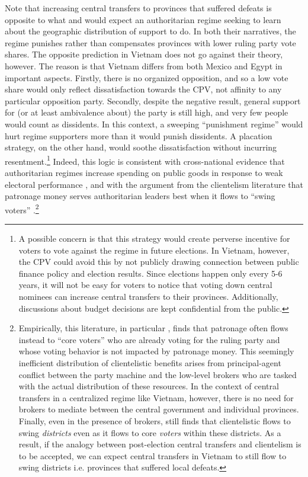 \documentclass[12pt]{article}\usepackage[]{graphicx}\usepackage[]{color}
\newcommand{\1}{\mathbbm{1}}
\begin{document}
Note that increasing central transfers to provinces that suffered defeats is opposite to what \cite{Magaloni2006} and \cite{Blaydes2008} would expect an authoritarian regime seeking to learn about the geographic distribution of support to do. In both their narratives, the regime punishes rather than compensates provinces with lower ruling party vote shares. The opposite prediction in Vietnam does not go against their theory, however. The reason is that Vietnam differs from both Mexico and Egypt in important aspects. Firstly, there is no organized opposition, and so a low vote share would only reflect dissatisfaction towards the CPV, not affinity to any particular opposition party. Secondly, despite the negative result, general support for (or at least ambivalence about) the party is still high, and very few people would count as dissidents. In this context, a sweeping ``punishment regime'' \citep{Magaloni2006} would hurt regime supporters more than it would punish dissidents. A  placation strategy, on the other hand, would soothe dissatisfaction without incurring resentment.\footnote{A possible concern is that this strategy would create perverse incentive for voters to vote against the regime in future elections. In Vietnam, however, the CPV could avoid this by not publicly drawing connection between public finance policy and election results. Since elections happen only every 5-6 years, it will not be easy for voters to notice that voting down central nominees can increase central transfers to their provinces. Additionally, discussions about budget decisions are kept confidential from the public.} Indeed, this logic is consistent with cross-national evidence that authoritarian regimes increase spending on public goods in response to weak electoral performance \citep{Miller2015}, and with the argument from the clientelism literature that patronage money serves authoritarian leaders best when it flows to ``swing voters'' \citep{DixitLondregan1996, Stokes2013}.\footnote{Empirically, this literature, in particular \cite{Stokes2013}, finds that patronage often flows instead to ``core voters'' who are already voting for the ruling party and whose voting behavior is not impacted by patronage money. This seemingly inefficient distribution of clientelistic benefits arises from principal-agent conflict between the party machine and the low-level brokers who are tasked with the actual distribution of these resources. In the context of central transfers in a centralized regime like Vietnam, however, there is no need for brokers to mediate between the central government and individual provinces. Finally, even in the presence of brokers, \cite{Stokes2013} still finds that clientelistic flows to swing \textit{districts} even as it flows to core \textit{voters} within these districts. As a result, if the analogy between post-election central transfers and clientelism is to be accepted, we can expect central transfers in Vietnam to still flow to swing districts i.e. provinces that suffered local defeats.} 
\end{document}
